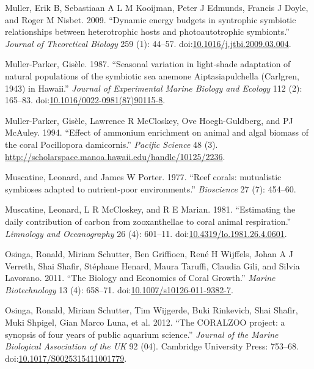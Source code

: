 \documentclass[]{elsarticle} %
\begin{document}
\hypertarget{ref-Muller:2009io}{}
Muller, Erik B, Sebastiaan A L M Kooijman, Peter J Edmunds, Francis J
Doyle, and Roger M Nisbet. 2009. ``Dynamic energy budgets in syntrophic
symbiotic relationships between heterotrophic hosts and photoautotrophic
symbionts.'' \emph{Journal of Theoretical Biology} 259 (1): 44--57.
doi:\href{https://doi.org/10.1016/j.jtbi.2009.03.004}{10.1016/j.jtbi.2009.03.004}.

\hypertarget{ref-MullerParker:1987cr}{}
Muller-Parker, Gisèle. 1987. ``Seasonal variation in light-shade
adaptation of natural populations of the symbiotic sea anemone
Aiptasiapulchella (Carlgren, 1943) in Hawaii.'' \emph{Journal of
Experimental Marine Biology and Ecology} 112 (2): 165--83.
doi:\href{https://doi.org/10.1016/0022-0981(87)90115-8}{10.1016/0022-0981(87)90115-8}.

\hypertarget{ref-MullerParker:1994uo}{}
Muller-Parker, Gisèle, Lawrence R McCloskey, Ove Hoegh-Guldberg, and PJ
McAuley. 1994. ``Effect of ammonium enrichment on animal and algal
biomass of the coral Pocillopora damicornis.'' \emph{Pacific Science} 48
(3). \url{http://scholarspace.manoa.hawaii.edu/handle/10125/2236}.

\hypertarget{ref-Muscatine:1977p4220}{}
Muscatine, Leonard, and James W Porter. 1977. ``Reef corals: mutualistic
symbioses adapted to nutrient-poor environments.'' \emph{Bioscience} 27
(7): 454--60.

\hypertarget{ref-Muscatine:1981jy}{}
Muscatine, Leonard, L R McCloskey, and R E Marian. 1981. ``Estimating
the daily contribution of carbon from zooxanthellae to coral animal
respiration.'' \emph{Limnology and Oceanography} 26 (4): 601--11.
doi:\href{https://doi.org/10.4319/lo.1981.26.4.0601}{10.4319/lo.1981.26.4.0601}.

\hypertarget{ref-Osinga:2011kq}{}
Osinga, Ronald, Miriam Schutter, Ben Griffioen, René H Wijffels, Johan A
J Verreth, Shai Shafir, Stéphane Henard, Maura Taruffi, Claudia Gili,
and Silvia Lavorano. 2011. ``The Biology and Economics of Coral
Growth.'' \emph{Marine Biotechnology} 13 (4): 658--71.
doi:\href{https://doi.org/10.1007/s10126-011-9382-7}{10.1007/s10126-011-9382-7}.

\hypertarget{ref-Osinga:2012is}{}
Osinga, Ronald, Miriam Schutter, Tim Wijgerde, Buki Rinkevich, Shai
Shafir, Muki Shpigel, Gian Marco Luna, et al. 2012. ``The CORALZOO
project: a synopsis of four years of public aquarium science.''
\emph{Journal of the Marine Biological Association of the UK} 92 (04).
Cambridge University Press: 753--68.
doi:\href{https://doi.org/10.1017/S0025315411001779}{10.1017/S0025315411001779}.
\end{document}
